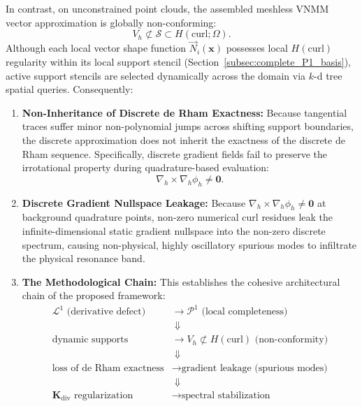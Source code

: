 \documentclass[preprint,12pt]{elsarticle}
\begin{document}
In contrast, on unconstrained point clouds, the assembled meshless VNMM vector approximation is globally non-conforming:
\begin{equation}
V_h \not\subset \mathcal{S} \subset H(\mathrm{curl}; \Omega).
\label{eq:nonconforming_space}
\end{equation}
Although each local vector shape function $\vec{N}_i(\mathbf{x})$ possesses local $H(\mathrm{curl})$ regularity within its local support stencil (Section~\ref{subsec:complete_P1_basis}), active support stencils are selected dynamically across the domain via $k$-d tree spatial queries. Consequently:
\begin{enumerate}
    \item \textbf{Non-Inheritance of Discrete de Rham Exactness:} Because tangential traces suffer minor non-polynomial jumps across shifting support boundaries, the discrete approximation does not inherit the exactness of the discrete de Rham sequence. Specifically, discrete gradient fields fail to preserve the irrotational property during quadrature-based evaluation:
    \begin{equation}
    \nabla_h \times \nabla_h \phi_h \neq \mathbf{0}.
    \label{eq:grad_curl_nonvanishing}
    \end{equation}
    \item \textbf{Discrete Gradient Nullspace Leakage:} Because $\nabla_h \times \nabla_h \phi_h \neq \mathbf{0}$ at background quadrature points, non-zero numerical curl residues leak the infinite-dimensional static gradient nullspace into the non-zero discrete spectrum, causing non-physical, highly oscillatory spurious modes to infiltrate the physical resonance band.
    \item \textbf{The Methodological Chain:} This establishes the cohesive architectural chain of the proposed framework:
    \begin{equation}
    \boxed{
    \begin{aligned}
    \mathcal{L}^1 \text{ (derivative defect)} &\longrightarrow \mathcal{P}^1 \text{ (local completeness)} \\
    &\;\Downarrow \\
    \text{dynamic supports} &\longrightarrow V_h \not\subset H(\mathrm{curl}) \text{ (non-conformity)} \\
    &\;\Downarrow \\
    \text{loss of de Rham exactness} &\longrightarrow \text{gradient leakage (spurious modes)} \\
    &\;\Downarrow \\
    \mathbf{K}_{\mathrm{div}} \text{ regularization} &\longrightarrow \text{spectral stabilization}
    \end{aligned}
    }
    \label{eq:conceptual_chain}
    \end{equation}
\end{enumerate}
\end{document}

